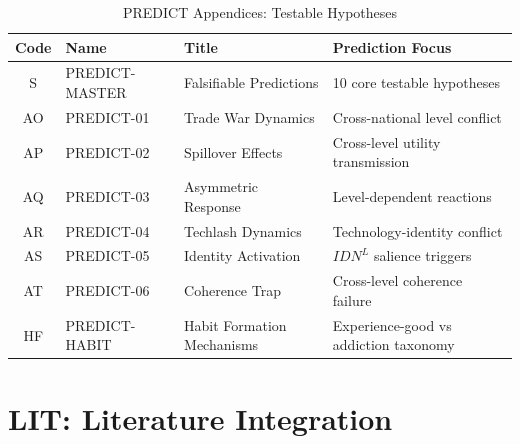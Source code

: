 \begin{table}[htbp]
\centering
\caption{PREDICT Appendices: Testable Hypotheses}
\label{tab:index-predict}
\renewcommand{\arraystretch}{1.3}
\begin{tabular}{@{}cllp{5cm}@{}}
\toprule
\textbf{Code} & \textbf{Name} & \textbf{Title} & \textbf{Prediction Focus} \\
\midrule
S & PREDICT-MASTER & Falsifiable Predictions & 10 core testable hypotheses \\
AO & PREDICT-01 & Trade War Dynamics & Cross-national level conflict \\
AP & PREDICT-02 & Spillover Effects & Cross-level utility transmission \\
AQ & PREDICT-03 & Asymmetric Response & Level-dependent reactions \\
AR & PREDICT-04 & Techlash Dynamics & Technology-identity conflict \\
AS & PREDICT-05 & Identity Activation & $IDN^L$ salience triggers \\
AT & PREDICT-06 & Coherence Trap & Cross-level coherence failure \\
HF & PREDICT-HABIT & Habit Formation Mechanisms & Experience-good vs addiction taxonomy \\
\bottomrule
\end{tabular}
\end{table}

\section{LIT: Literature Integration}
\label{sec:index-lit}


